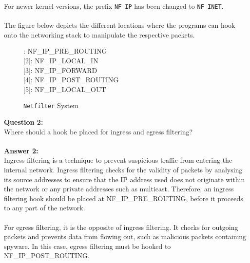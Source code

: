 \documentclass[a4paper,12pt]{article}
\begin{document}
\noindent *For newer kernel versions, the prefix \texttt{NF\_IP} has been changed to \texttt{NF\_INET}.\\\\The figure below depicts the different locations where the programs can hook onto the networking stack to manipulate the respective packets.
\begin{figure}[H]
	\centering
		\flushleft
[1]: NF\_IP\_PRE\_ROUTING\\
{[2]}: NF\_IP\_LOCAL\_IN\\
{[3]}: NF\_IP\_FORWARD\\
{[4]}: NF\_IP\_POST\_ROUTING\\
{[5]}: NF\_IP\_LOCAL\_OUT
	\caption{\texttt{Netfilter} System}
	\label{fig:NetSys}
\end{figure}
\noindent \textbf{Question 2:}\\
Where should a hook be placed for ingress and egress filtering?\\\\
\textbf{Answer 2:}\\
Ingress filtering is a technique to prevent suspicious traffic from entering the internal network. Ingress filtering checks for the validity of packets by analysing its source addresses to ensure that the IP address used does not originate within the network or any private addresses such as multicast. Therefore, an ingress filtering hook should be placed at NF\_IP\_PRE\_ROUTING, before it proceeds to any part of the network.\\\\For egress filtering, it is the opposite of ingress filtering. It checks for outgoing packets and prevents data from flowing out, such as malicious packets containing spyware. In this case, egress filtering must be hooked to NF\_IP\_POST\_ROUTING.\\\\
\end{document}
